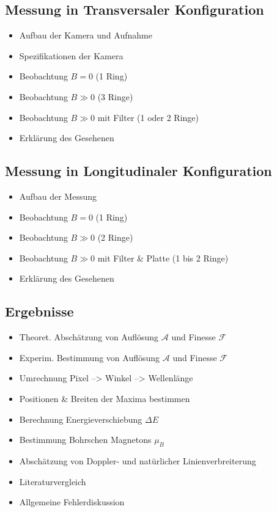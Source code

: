 \subsection{Messung in Transversaler Konfiguration}
    \begin{itemize}
        \item Aufbau der Kamera und Aufnahme
        \item Spezifikationen der Kamera
        \item Beobachtung $B = 0$ (1 Ring)
        \item Beobachtung $B \gg 0$ (3 Ringe)
        \item Beobachtung $B \gg 0$ mit Filter (1 oder 2 Ringe)
        \item Erklärung des Gesehenen
    \end{itemize}




\subsection{Messung in Longitudinaler Konfiguration}
    \begin{itemize}
        \item Aufbau der Messung 
        \item Beobachtung $B = 0$ (1 Ring)
        \item Beobachtung $B \gg 0$ (2 Ringe)
        \item Beobachtung $B \gg 0$ mit Filter \& Platte (1 bis 2 Ringe)
        \item Erklärung des Gesehenen
    \end{itemize}
    
    
\subsection{Ergebnisse}
    \begin{itemize}
        \item Theoret. Abschätzung von Auflösung $\mathcal{A}$ und Finesse $\mathcal{F}$
        \item Experim. Bestimmung von Auflösung $\mathcal{A}$ und Finesse $\mathcal{F}$
        \item Umrechnung Pixel --> Winkel --> Wellenlänge
        \item Positionen \& Breiten der Maxima bestimmen
        \item Berechnung Energieverschiebung $\Delta E$
        \item Bestimmung Bohrschen Magnetons $\mu_B$
        \item Abschätzung von Doppler- und natürlicher Linienverbreiterung 
        \item Literaturvergleich
        \item Allgemeine Fehlerdiskussion 
    \end{itemize}


